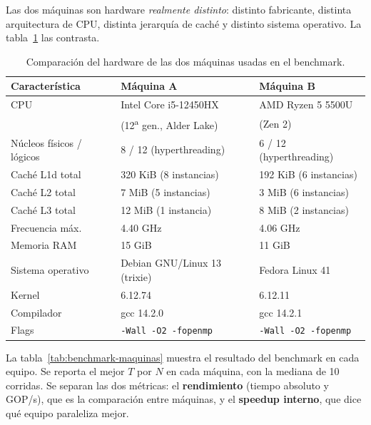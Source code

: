 Las dos máquinas son hardware \emph{realmente distinto}: distinto fabricante, distinta arquitectura de CPU, distinta jerarquía de caché y distinto sistema operativo. La tabla~\ref{tab:hardware} las contrasta.

\begin{table}[ht]
\centering
\small
\begin{tabular}{|l|l|l|}
\hline
\textbf{Característica} & \textbf{Máquina A} & \textbf{Máquina B} \\
\hline
CPU & Intel Core i5-12450HX & AMD Ryzen 5 5500U \\
 & (12\textsuperscript{a} gen., Alder Lake) & (Zen 2) \\
Núcleos físicos / lógicos & 8 / 12 (hyperthreading) & 6 / 12 (hyperthreading) \\
Caché L1d total & 320 KiB (8 instancias) & 192 KiB (6 instancias) \\
Caché L2 total & 7 MiB (5 instancias) & 3 MiB (6 instancias) \\
Caché L3 total & 12 MiB (1 instancia) & 8 MiB (2 instancias) \\
Frecuencia máx. & 4.40 GHz & 4.06 GHz \\
Memoria RAM & 15 GiB & 11 GiB \\
Sistema operativo & Debian GNU/Linux 13 (trixie) & Fedora Linux 41 \\
Kernel & 6.12.74 & 6.12.11 \\
Compilador & gcc 14.2.0 & gcc 14.2.1 \\
Flags & \texttt{-Wall -O2 -fopenmp} & \texttt{-Wall -O2 -fopenmp} \\
\hline
\end{tabular}
\caption{Comparación del hardware de las dos máquinas usadas en el benchmark.}
\label{tab:hardware}
\end{table}

La tabla~\ref{tab:benchmark-maquinas} muestra el resultado del benchmark en cada equipo. Se reporta el mejor $T$ por $N$ en cada máquina, con la mediana de 10 corridas. Se separan las dos métricas: el \textbf{rendimiento} (tiempo absoluto y GOP/s), que es la comparación entre máquinas, y el \textbf{speedup interno}, que dice qué equipo paraleliza mejor.

